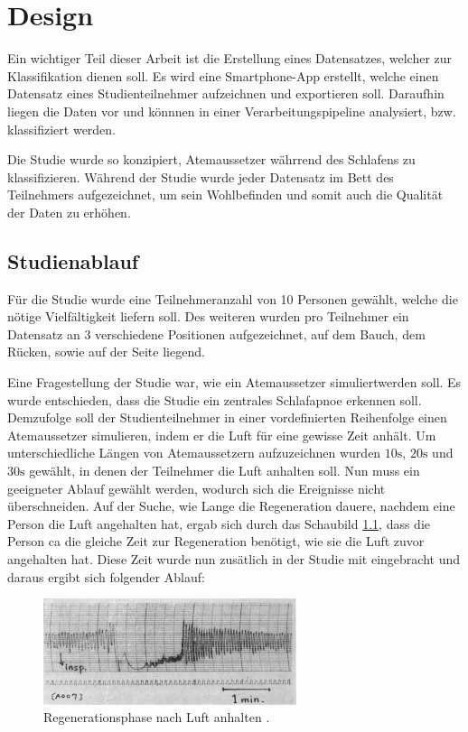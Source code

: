 \chapter{Design}
\label{ch:Design}

Ein wichtiger Teil dieser Arbeit ist die Erstellung eines Datensatzes, welcher zur Klassifikation dienen soll.
Es wird eine Smartphone-App erstellt, welche einen Datensatz eines Studienteilnehmer aufzeichnen und exportieren soll. 
Daraufhin liegen die Daten vor und könnnen in einer Verarbeitungspipeline analysiert, bzw. klassifiziert werden.

Die Studie wurde so konzipiert, Atemaussetzer währrend des Schlafens zu klassifizieren. 
Während der Studie wurde jeder Datensatz im Bett des Teilnehmers aufgezeichnet, um sein Wohlbefinden und somit auch die Qualität der Daten zu erhöhen.

\section{Studienablauf}
Für die Studie wurde eine Teilnehmeranzahl von 10 Personen gewählt, welche die nötige Vielfältigkeit liefern soll.
Des weiteren wurden pro Teilnehmer ein Datensatz an 3 verschiedene Positionen aufgezeichnet, auf dem Bauch, dem Rücken, sowie auf der Seite liegend.

Eine Fragestellung der Studie war, wie ein Atemaussetzer \glqq simuliert\grqq werden soll. 
Es wurde entschieden, dass die Studie ein zentrales Schlafapnoe erkennen soll. 
Demzufolge soll der Studienteilnehmer in einer vordefinierten Reihenfolge einen Atemaussetzer \glqq simulieren\grqq, indem er die Luft für eine gewisse Zeit anhält.
Um unterschiedliche Längen von Atemaussetzern aufzuzeichnen wurden $10\si{\s}$, $20\si{\s}$ und $30\si{\s}$ gewählt, in denen der Teilnehmer die Luft anhalten soll. 
Nun muss ein geeigneter Ablauf gewählt werden, wodurch sich die Ereignisse nicht überschneiden.
Auf der Suche, wie Lange die Regeneration dauere, nachdem eine Person die Luft angehalten hat, ergab sich durch das Schaubild \ref{fig_respiration_regeneration}, 
dass die Person ca die gleiche Zeit zur Regeneration benötigt, wie sie die Luft zuvor angehalten hat.
Diese Zeit wurde nun zusätlich in der Studie mit eingebracht und daraus ergibt sich folgender Ablauf:
\begin{figure}[ht]
    \centering
    \includegraphics[width=0.66\textwidth]{images/respiration/respiration_regeneration}
    \caption{Regenerationsphase nach Luft anhalten \cite{hernandez_cardiac_nodate}.}
    \label{fig_respiration_regeneration}
\end{figure}

